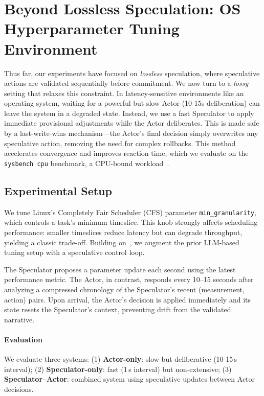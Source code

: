\section{Beyond Lossless Speculation: OS Hyperparameter Tuning Environment}
\label{sec:os-speculation}
Thus far, our experiments have focused on \emph{lossless} speculation, where speculative actions are validated sequentially before commitment. We now turn to a \emph{lossy} setting that relaxes this constraint.
In latency-sensitive environments like an operating system, 
waiting for a powerful but slow Actor (10-15s deliberation) can leave the system in a degraded state.
Instead, we use a fast Speculator to apply immediate provisional adjustments while the Actor deliberates. 
This is made safe by a last-write-wins mechanism—the Actor's final decision 
simply overwrites any speculative action, 
removing the need for complex rollbacks. 
This method accelerates convergence and improves reaction time, 
which we evaluate on the \texttt{sysbench cpu} benchmark, a CPU-bound workload~\citep{sysbench}.
\subsection{Experimental Setup}
We tune Linux's Completely Fair Scheduler (CFS) parameter \texttt{min\_granularity}, 
which controls a task's minimum timeslice. 
This knob strongly affects scheduling performance: smaller timeslices reduce latency but can degrade throughput, yielding a classic trade-off. Building on~\citep{liargkovas2025llmTuning}, we augment the prior LLM-based tuning setup with a speculative control loop.

The Speculator proposes a parameter update each second using the latest performance metric. 
The Actor, in contrast, responds every 10–15 seconds after analyzing a compressed chronology of the Speculator's recent (measurement, action) pairs.
Upon arrival, the Actor’s decision is applied immediately and its state resets the Speculator’s context, preventing drift from the validated narrative.

\vspace{-5pt}
\paragraph{Evaluation}
We evaluate three systems: (1) \textbf{Actor-only}: slow but deliberative (10-15\,s interval); (2) \textbf{Speculator-only}: fast (1\,s interval) but non-extensive; (3) \textbf{Speculator–Actor}: combined system using speculative updates between Actor decisions.


